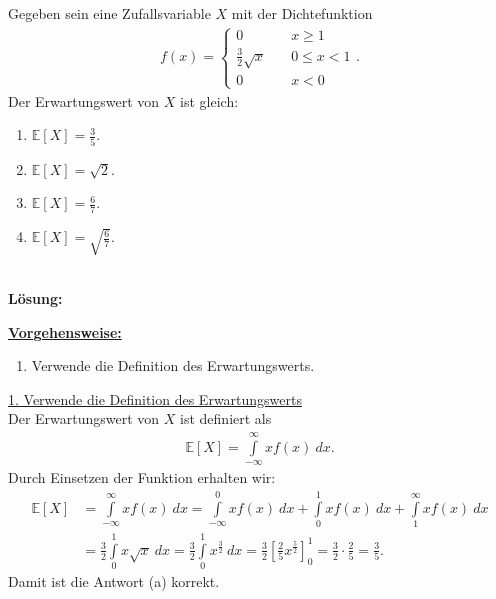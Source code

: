 \subsection*{}
Gegeben sein eine Zufallsvariable $ X $ mit der Dichtefunktion
\begin{align*}
	f(x)
	=
	\begin{cases}
		0 \quad &x \geq 1\\
		\frac{3}{2} \sqrt{x} \quad &0 \leq x < 1\\
		0 \quad &x<0
	\end{cases}.
\end{align*}
Der Erwartungswert von $ X $ ist gleich:
\renewcommand{\labelenumi}{(\alph{enumi})}
\begin{enumerate}
	\item 
	$\mathbb{E}[X] = \frac{3}{5}$.
	\item
	$\mathbb{E}[X] = \sqrt{2}$.
	\item
	$\mathbb{E}[X] = \frac{6}{7}$.
	\item
	$\mathbb{E}[X] = \sqrt{\frac{6}{7}}$.
\end{enumerate}
\ \\
\textbf{Lösung:}
\begin{mdframed}
\underline{\textbf{Vorgehensweise:}}
\renewcommand{\labelenumi}{\theenumi.}
\begin{enumerate}
\item Verwende die Definition des Erwartungswerts.
\end{enumerate}
\end{mdframed}

\underline{1. Verwende die Definition des Erwartungswerts}\\
Der Erwartungswert von $ X $ ist definiert als
\begin{align*}
	\mathbb{E}[X] = \int \limits_{- \infty}^\infty x f(x) \ dx.
\end{align*}
Durch Einsetzen der Funktion erhalten wir:
\begin{align*}
	\mathbb{E}[X] 
	&= \int \limits_{- \infty}^\infty x f(x) \ dx
	= \int \limits_{- \infty}^0 x f(x) \ dx 
	+ \int \limits_{0}^1 x f(x) \ dx 
	+ \int \limits_{1}^\infty x f(x) \ dx \\
	&= \frac{3}{2} \int \limits_{0}^1 x \sqrt{x} \ dx
	= \frac{3}{2} \int \limits_{0}^1 x^{\frac{3}{2}} \ dx
	= \frac{3}{2} \left[\frac{2}{5} x^{\frac{5}{2}}\right]_0^1
	= \frac{3}{2} \cdot \frac{2}{5} = \frac{3}{5}.
\end{align*}
Damit ist die Antwort (a) korrekt.

